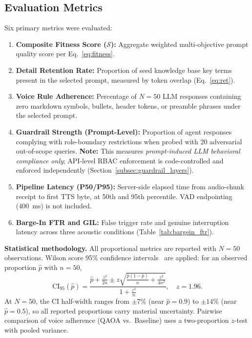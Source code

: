 \documentclass[11pt,a4paper]{article}
\begin{document}
\subsection{Evaluation Metrics}
\label{subsec:eval_metrics}

Six primary metrics were evaluated:
\begin{enumerate}[leftmargin=*]
    \item \textbf{Composite Fitness Score ($\mathcal{S}$):} Aggregate weighted multi-objective prompt quality score per Eq.~\ref{eq:fitness}.
    \item \textbf{Detail Retention Rate:} Proportion of seed knowledge base key terms present in the selected prompt, measured by token overlap (Eq.~\ref{eq:ret}).
    \item \textbf{Voice Rule Adherence:} Percentage of $N=50$ LLM responses containing zero markdown symbols, bullets, header tokens, or preamble phrases under the selected prompt.
    \item \textbf{Guardrail Strength (Prompt-Level):} Proportion of agent responses complying with role-boundary restrictions when probed with 20 adversarial out-of-scope queries. \textbf{Note:} This measures \textit{prompt-induced LLM behavioral compliance only}; API-level RBAC enforcement is code-controlled and enforced independently (Section~\ref{subsec:guardrail_layers}).
    \item \textbf{Pipeline Latency (P50/P95):} Server-side elapsed time from audio-chunk receipt to first TTS byte, at 50th and 95th percentile. VAD endpointing (400~ms) is not included.
    \item \textbf{Barge-In FTR and GIL:} False trigger rate and genuine interruption latency across three acoustic conditions (Table~\ref{tab:bargein_ftr}).
\end{enumerate}

\textbf{Statistical methodology.} All proportional metrics are reported with $N=50$ observations. Wilson score 95\% confidence intervals~\cite{wilson1927probable} are applied: for an observed proportion $\hat{p}$ with $n=50$,
\begin{equation}
\text{CI}_{95}(\hat{p}) = \frac{\hat{p} + \frac{z^2}{2n} \pm z\sqrt{\frac{\hat{p}(1-\hat{p})}{n} + \frac{z^2}{4n^2}}}{1+\frac{z^2}{n}}, \quad z=1.96.
\label{eq:wilson_ci}
\end{equation}
At $N=50$, the CI half-width ranges from $\pm 7$\% (near $\hat{p}=0.9$) to $\pm 14$\% (near $\hat{p}=0.5$), so all reported proportions carry material uncertainty. Pairwise comparison of voice adherence (QAOA vs.\ Baseline) uses a two-proportion $z$-test with pooled variance.
\end{document}
